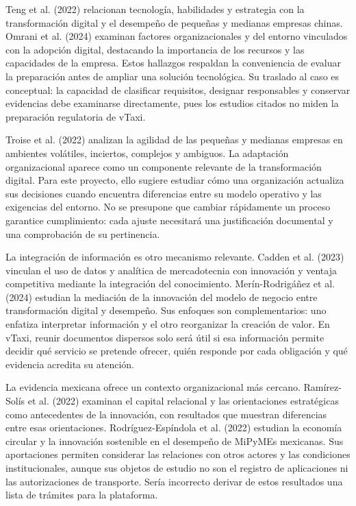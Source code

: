 {Teng et al. (2022) relacionan tecnología, habilidades y estrategia con la transformación digital y el desempeño de pequeñas y medianas empresas chinas. Omrani et al. (2024) examinan factores organizacionales y del entorno vinculados con la adopción digital, destacando la importancia de los recursos y las capacidades de la empresa. Estos hallazgos respaldan la conveniencia de evaluar la preparación antes de ampliar una solución tecnológica. Su traslado al caso es conceptual: la capacidad de clasificar requisitos, designar responsables y conservar evidencias debe examinarse directamente, pues los estudios citados no miden la preparación regulatoria de vTaxi.


Troise et al. (2022) analizan la agilidad de las pequeñas y medianas empresas en ambientes volátiles, inciertos, complejos y ambiguos. La adaptación organizacional aparece como un componente relevante de la transformación digital. Para este proyecto, ello sugiere estudiar cómo una organización actualiza sus decisiones cuando encuentra diferencias entre su modelo operativo y las exigencias del entorno. No se presupone que cambiar rápidamente un proceso garantice cumplimiento: cada ajuste necesitará una justificación documental y una comprobación de su pertinencia.


La integración de información es otro mecanismo relevante. Cadden et al. (2023) vinculan el uso de datos y analítica de mercadotecnia con innovación y ventaja competitiva mediante la integración del conocimiento. Merín-Rodrigáñez et al. (2024) estudian la mediación de la innovación del modelo de negocio entre transformación digital y desempeño. Sus enfoques son complementarios: uno enfatiza interpretar información y el otro reorganizar la creación de valor. En vTaxi, reunir documentos dispersos solo será útil si esa información permite decidir qué servicio se pretende ofrecer, quién responde por cada obligación y qué evidencia acredita su atención.


La evidencia mexicana ofrece un contexto organizacional más cercano. Ramírez-Solís et al. (2022) examinan el capital relacional y las orientaciones estratégicas como antecedentes de la innovación, con resultados que muestran diferencias entre esas orientaciones. Rodríguez-Espíndola et al. (2022) estudian la economía circular y la innovación sostenible en el desempeño de MiPyMEs mexicanas. Sus aportaciones permiten considerar las relaciones con otros actores y las condiciones institucionales, aunque sus objetos de estudio no son el registro de aplicaciones ni las autorizaciones de transporte. Sería incorrecto derivar de estos resultados una lista de trámites para la plataforma.


}
